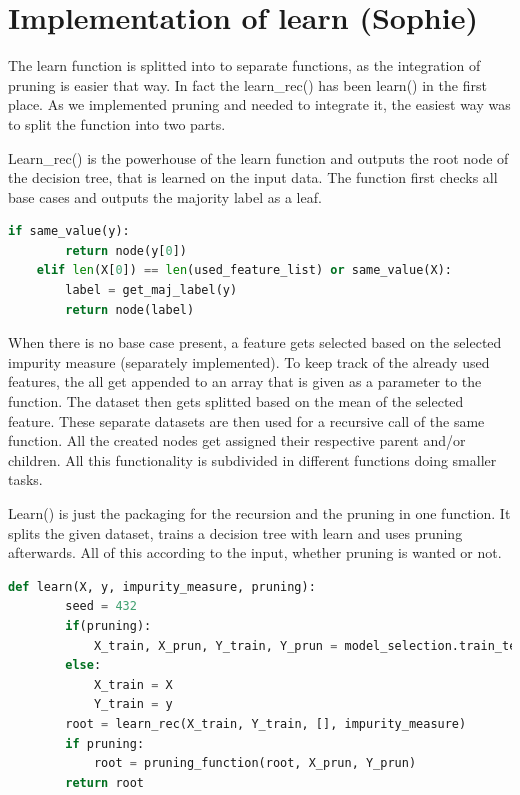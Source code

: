 \documentclass[12pt,a4paper]{scrartcl}		%
\begin{document}
\section{Implementation of learn (Sophie)}
The learn function is splitted into to separate functions, as the integration of pruning is easier that way. 
In fact the learn\_rec() has been learn() in the first place. As we implemented pruning and needed to integrate 
it, the easiest way was to split the function into two parts.

Learn\_rec() is the powerhouse of the learn function and outputs the root node of the decision tree, that is 
learned on the input data. 
The function first checks all base cases and outputs the majority label as a leaf. 

\begin{lstlisting}[language=Python]
    if same_value(y):
        return node(y[0])
    elif len(X[0]) == len(used_feature_list) or same_value(X):
        label = get_maj_label(y)
        return node(label)
\end{lstlisting}

When there is no base case 
present, a feature gets selected based on the selected impurity measure (separately implemented). To keep track 
of the already used features, the all get appended to an array that is given as a parameter to the function. 
The dataset then gets splitted based on the mean of the selected feature. These separate datasets are then 
used for a recursive call of the same function. All the created nodes get assigned their respective parent 
and/or children.
All this functionality is subdivided in different functions doing smaller tasks.

Learn()  is just the packaging for the recursion and the pruning in one function. It splits the given dataset, 
trains a decision tree with learn and uses pruning afterwards. All of this according to the input, whether 
pruning is wanted or not.

\begin{lstlisting}[language=Python]
    def learn(X, y, impurity_measure, pruning):
        seed = 432
        if(pruning):
            X_train, X_prun, Y_train, Y_prun = model_selection.train_test_split(X, y, test_size= 0.3, shuffle=True,                                                                                 random_state = seed)
        else:
            X_train = X
            Y_train = y
        root = learn_rec(X_train, Y_train, [], impurity_measure)
        if pruning:
            root = pruning_function(root, X_prun, Y_prun)
        return root
\end{lstlisting}
\end{document}
